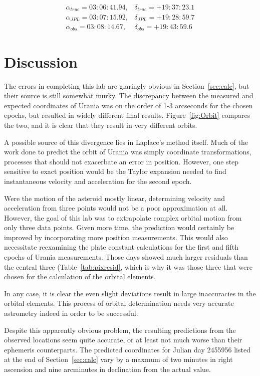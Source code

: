 \documentclass[a4paper,12pt]{article}
\begin{document}
\begin{eqnarray}
\alpha_{true} = 03:06:41.94, & \delta_{true} = +19:37:23.1 \nonumber\\
\alpha_{JPL} = 03:07:15.92, & \delta_{JPL} = +19:28:59.7 \nonumber\\
\alpha_{obs} = 03:08:14.67, & \delta_{obs} = +19:43:59.6 \nonumber
\end{eqnarray}

\section{Discussion}
\label{sec:discussion}

The errors in completing this lab are glaringly obvious in Section~\ref{sec:calc}, but their source is still somewhat murky. The discrepancy between the measured and expected coordinates of Urania was on the order of 1-3 arcseconds for the chosen epochs, but resulted in widely different final results. Figure~\ref{fig:Orbit} compares the two, and it is clear that they result in very different orbits.

A possible source of this divergence lies in Laplace's method itself. Much of the work done to predict the orbit of Urania was simply coordinate transformations, processes that should not exacerbate an error in position. However, one step sensitive to exact position would be the Taylor expansion needed to find instantaneous velocity and acceleration for the second epoch. 

Were the motion of the asteroid mostly linear, determining velocity and acceleration from three points would not be a poor approximation at all. However, the goal of this lab was to extrapolate complex orbital motion from only three data points. Given more time, the prediction would certainly be improved by incorporating more position measurements. This would also necessitate reexamining the plate constant calculations for the first and fifth epochs of Urania measurements. Those days showed much larger residuals than the central three (Table~\ref{tab:pixresid}, which is why it was those three that were chosen for the calculation of the orbital elements. 

In any case, it is clear the even slight deviations result in large inaccuracies in the orbital elements. This process of orbital determination needs very accurate astrometry indeed in order to be successful.

Despite this apparently obvious problem, the resulting predictions from the observed locations seem quite accurate, or at least not much worse than their ephemeris counterparts. The predicted coordinates for Julian day 2455956 listed at the end of Section~\ref{sec:calc} vary by a maxmum of two minutes in right ascension and nine arcminutes in declination from the actual value. 
\end{document}
